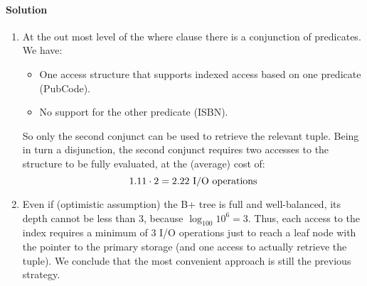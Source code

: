 \paragraph*{Solution}
\begin{enumerate}
    \item At the out most level of the where clause there is a conjunction of predicates.
        We have: 
        \begin{itemize}
            \item One access structure that supports indexed access based on one predicate (PubCode). 
            \item No support for the other predicate (ISBN). 
        \end{itemize}
        So only the second conjunct can be used to retrieve the relevant tuple.
        Being in turn a disjunction, the second conjunct requires two accesses to the structure to be fully evaluated, at the (average) cost of: 
        \[1.11 \cdot 2 = 2.22 \textnormal{ I/O operations}\]
    \item Even if (optimistic assumption) the B+ tree is full and well-balanced, its depth cannot be less than 3, because $\log_{100}10^6=3$. 
        Thus, each access to the index requires a minimum of 3 I/O operations just to reach a leaf node with the pointer to the primary storage (and one access to actually retrieve the tuple). 
        We conclude that the most convenient approach is still the previous strategy.
\end{enumerate}